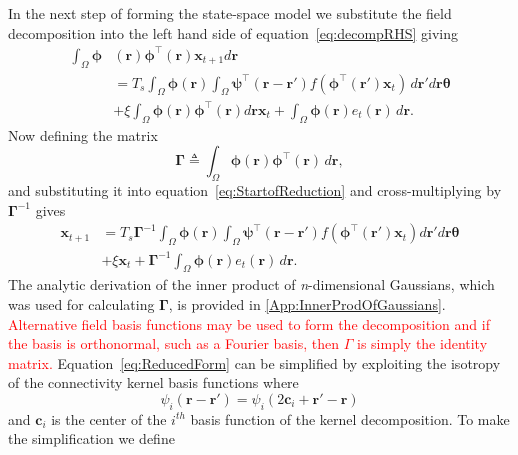 \documentclass[review,authoryear,3p]{elsarticle}
\newcommand{\dean}[1]{\textcolor{red}{#1}}
\begin{document}
In the next step of forming the state-space model we substitute the field decomposition into the left hand side of equation~\ref{eq:decompRHS} giving
\begin{align}
	\label{eq:StartofReduction}
 	\int_\Omega \boldsymbol{\phi}&\left(\mathbf{r}\right) \boldsymbol{\phi}^{\top}\left(\mathbf{r}\right)\mathbf{x}_{t+1}d\mathbf{r}  \nonumber \\
	&= T_s \int_\Omega \boldsymbol{\phi} (\mathbf{r}) \int_\Omega \boldsymbol{\psi}^{\top} (\mathbf{r}-\mathbf{r}') f(\boldsymbol{\phi}^{\top}(\mathbf{r}') \mathbf{x}_t ) \, d\mathbf{r}'d\mathbf{r}\boldsymbol{\theta} \nonumber \\ 
	&+ \xi\int_\Omega {\boldsymbol{\phi}(\mathbf{r}) \boldsymbol{\phi}^{\top}(\mathbf{r})d\mathbf{r} } \mathbf{x}_t + \int_\Omega{\boldsymbol{\phi} (\mathbf{r}) e_t(\mathbf{r}) \, d\mathbf{r}}. 
\end{align}
Now defining the matrix
\begin{equation}\label{eq:DefGamma}
	\boldsymbol{\Gamma} \triangleq \int_\Omega {\boldsymbol{\phi} \left(\mathbf{r}\right)\boldsymbol{\phi} ^{\top}\left(\mathbf{r}\right) \, d\mathbf{r}}, 
\end{equation}
and substituting it into equation~\ref{eq:StartofReduction} and cross-multiplying by $\boldsymbol{\Gamma}^{-1}$ gives
\begin{align}
    \label{eq:ReducedForm}
	 \mathbf{x}_{t+1} &= T_s\boldsymbol{\Gamma}^{-1}
	 \int_\Omega \boldsymbol{\phi}(\mathbf{r}) 
	 \int_\Omega \boldsymbol{\psi}^{\top} (\mathbf{r}-\mathbf{r}')f(\boldsymbol{\phi}^{\top}(\mathbf{r}')\mathbf{x}_t)d\mathbf{r}' d\mathbf{r} \boldsymbol{\theta}  \nonumber \\
	& + \xi\mathbf{x}_t + \boldsymbol{\Gamma}^{-1} \int_\Omega{\boldsymbol{\phi}(\mathbf{r}) e_t(\mathbf{r}) \, d\mathbf{r}}.
\end{align}
The analytic derivation of the inner product of \emph{n}-dimensional Gaussians, which was used for calculating $\mathbf\Gamma$, is provided in \ref{App:InnerProdOfGaussians}. \dean{Alternative field basis functions may be used to form the decomposition and if the basis is orthonormal, such as a Fourier basis, then $\Gamma$ is simply the identity matrix.} Equation~\ref{eq:ReducedForm} can be simplified by exploiting the isotropy of the connectivity kernel basis functions where
\begin{equation}
	\psi_i (\mathbf{r}-\mathbf{r}') = \psi_i (2\mathbf{c}_i+\mathbf{r}'-\mathbf{r})
\end{equation}
and $\mathbf{c}_i$ is the center of the $i^{th}$ basis function of the kernel decomposition. To make the simplification we define
\end{document}
